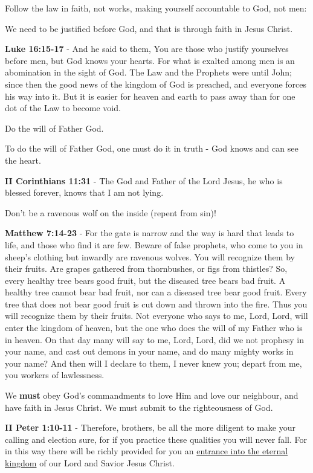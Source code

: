 \documentclass[11pt]{article}
\begin{document}
Follow the law in faith, not works, making yourself accountable to God, not men:

We need to be justified before God, and that is through faith in Jesus Christ.

\textbf{Luke 16:15-17} - And he said to them, You are those who justify yourselves before men, but God knows your hearts. For what is exalted among men is an abomination in the sight of God.  The Law and the Prophets were until John; since then the good news of the kingdom of God is preached, and everyone forces his way into it. But it is easier for heaven and earth to pass away than for one dot of the Law to become void.

Do the will of Father God.

To do the will of Father God, one must do it in truth - God knows and can see the heart.

\textbf{II Corinthians 11:31} - The God and Father of the Lord Jesus, he who is blessed forever, knows that I am not lying.

Don't be a ravenous wolf on the inside (repent from sin)!

\textbf{Matthew 7:14-23} - For the gate is narrow and the way is hard that leads to life, and those who find it are few.  Beware of false prophets, who come to you in sheep's clothing but inwardly are ravenous wolves.  You will recognize them by their fruits. Are grapes gathered from thornbushes, or figs from thistles?  So, every healthy tree bears good fruit, but the diseased tree bears bad fruit.  A healthy tree cannot bear bad fruit, nor can a diseased tree bear good fruit.  Every tree that does not bear good fruit is cut down and thrown into the fire.  Thus you will recognize them by their fruits.  Not everyone who says to me, Lord, Lord, will enter the kingdom of heaven, but the one who does the will of my Father who is in heaven.  On that day many will say to me, Lord, Lord, did we not prophesy in your name, and cast out demons in your name, and do many mighty works in your name?  And then will I declare to them, I never knew you; depart from me, you workers of lawlessness.

We \textbf{must} obey God's commandments to love Him and love our neighbour, and have faith in Jesus Christ.
We must submit to the righteousness of God.

\textbf{II Peter 1:10-11} - Therefore, brothers, be all the more diligent to make your calling and election sure, for if you practice these qualities you will never fall. For in this way there will be richly provided for you an \uline{entrance into the eternal kingdom} of our Lord and Savior Jesus Christ.
\end{document}
